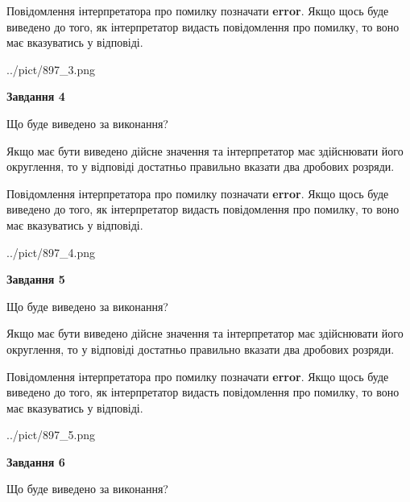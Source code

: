 \documentclass[12pt, ukrainian]{article}
\begin{document}
{\begin {Large}
Повідомлення інтерпретатора про помилку позначати \textbf{error}.
Якщо щось буде виведено до того, як інтерпретатор видасть повідомлення про помилку, 
то воно має вказуватись у відповіді. \par

\begin{center}
	{../pict/897_3.png}
\end{center}
\newpage

{\begin {center}\textbf{Завдання 4}\end {center}}\par
Що буде виведено за виконання? \par

Якщо має бути виведено дійсне значення та інтерпретатор має здійснювати його округлення, 
то у відповіді достатньо правильно вказати два дробових розряди.

Повідомлення інтерпретатора про помилку позначати \textbf{error}.
Якщо щось буде виведено до того, як інтерпретатор видасть повідомлення про помилку, 
то воно має вказуватись у відповіді. \par

\begin{center}
	{../pict/897_4.png}
\end{center}
\newpage

{\begin {center}\textbf{Завдання 5}\end {center}}\par
Що буде виведено за виконання? \par

Якщо має бути виведено дійсне значення та інтерпретатор має здійснювати його округлення, 
то у відповіді достатньо правильно вказати два дробових розряди.

Повідомлення інтерпретатора про помилку позначати \textbf{error}.
Якщо щось буде виведено до того, як інтерпретатор видасть повідомлення про помилку, 
то воно має вказуватись у відповіді. \par

\begin{center}
	{../pict/897_5.png}
\end{center}
\newpage

{\begin {center}\textbf{Завдання 6}\end {center}}\par
Що буде виведено за виконання? \par


\end{Large}}
\end{document}
